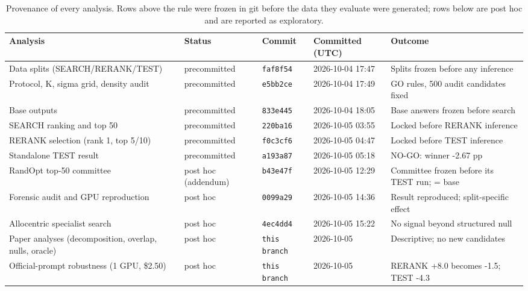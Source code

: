 \begin{table}[t]
\centering
\small
\begin{adjustbox}{max width=\linewidth}
\begin{tabular}{p{4.2cm}llll}
\toprule
Analysis & Status & Commit & Committed (UTC) & Outcome \\
\midrule
Data splits (SEARCH/RERANK/TEST) & precommitted & \texttt{faf8f54} & 2026-10-04 17:47 & Splits frozen before any inference \\
Protocol, K, sigma grid, density audit & precommitted & \texttt{e5bb2ce} & 2026-10-04 17:49 & GO rules, 500 audit candidates fixed \\
Base outputs & precommitted & \texttt{833e445} & 2026-10-04 18:05 & Base answers frozen before search \\
SEARCH ranking and top 50 & precommitted & \texttt{220ba16} & 2026-10-05 03:55 & Locked before RERANK inference \\
RERANK selection (rank 1, top 5/10) & precommitted & \texttt{f0c3cf6} & 2026-10-05 04:47 & Locked before TEST inference \\
Standalone TEST result & precommitted & \texttt{a193a87} & 2026-10-05 05:18 & NO-GO: winner -2.67 pp \\
\midrule
RandOpt top-50 committee & post hoc (addendum) & \texttt{b43e47f} & 2026-10-05 12:29 & Committee frozen before its TEST run; = base \\
Forensic audit and GPU reproduction & post hoc & \texttt{0099a29} & 2026-10-05 14:36 & Result reproduced; split-specific effect \\
Allocentric specialist search & post hoc & \texttt{4ec4dd4} & 2026-10-05 15:22 & No signal beyond structured null \\
Paper analyses (decomposition, overlap, nulls, oracle) & post hoc & \texttt{this branch} & 2026-10-05 & Descriptive; no new candidates \\
Official-prompt robustness (1 GPU, \$2.50) & post hoc & \texttt{this branch} & 2026-10-05 & RERANK +8.0 becomes -1.5; TEST -4.3 \\
\bottomrule
\end{tabular}
\end{adjustbox}
\caption{Provenance of every analysis. Rows above the rule were frozen in git before the data they evaluate were generated; rows below are post hoc and are reported as exploratory.}
\label{tab:provenance}
\end{table}
